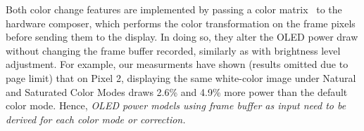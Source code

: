 Both color change features are implemented by passing a color
matrix~\cite{colormatrix} to the hardware composer, which performs the
color transformation on the frame pixels before sending them to the
display. In doing so,
they alter the OLED power draw without changing
the frame buffer recorded, similarly as with brightness level adjustment.
{For example, our measurments have shown (results omitted due to page limit)
  that on Pixel 2, displaying the same
  white-color image under Natural and Saturated Color Modes
draws 2.6\% and 4.9\% more power than the default color mode.
}
Hence, {\em OLED power models using frame buffer as input need to be derived
for each color mode or correction.}


